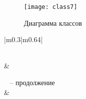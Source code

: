 \documentclass[a4paper,14pt]{extarticle}
\begin{document}
\label{sec:pril}

\begin{figure}[h!]
	\centering
	\texttt{[image: class7]}
	\caption{Диаграмма классов}
	\label{img:classd1}
\end{figure}

\small
\begin{longtable}{|m{0.3\linewidth}|m{0.64\linewidth}|}
	
	\caption{Описание классов диаграммы} \label{tab:long} 
	\\\hline
	 &  \\ \hline
	\endfirsthead
	
	{ \tablename\ \thetable{} -- продолжение} \\
	\hline {} &  \\ \hline
	\endhead
	
     \\
	\endfoot
	
	\endlastfoot


\end{longtable}
\end{document}
